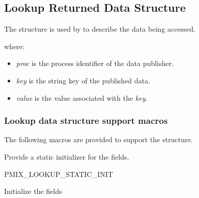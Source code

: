 \subsection{Lookup Returned Data Structure}

The  structure is used by  to describe the data being accessed.


where:
\begin{itemize}
    \item \emph{proc} is the process identifier of the data publisher.
    \item \emph{key} is the string key of the published data.
    \item \emph{value} is the value associated with the \emph{key}.
\end{itemize}


\subsubsection{Lookup data structure support macros}

The following macros are provided to support the  structure.


Provide a static initializer for the  fields.

\cspecificstart
\begin{codepar}
PMIX_LOOKUP_STATIC_INIT
\end{codepar}
\cspecificend



Initialize the  fields

